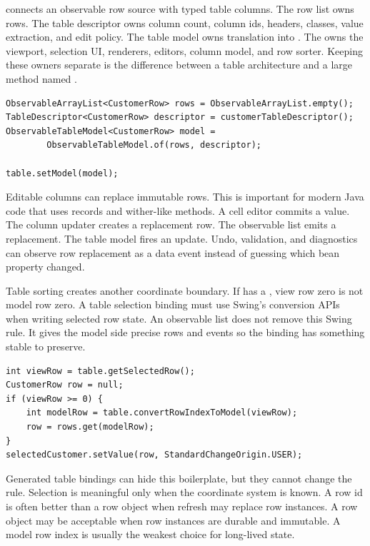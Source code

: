  connects an observable row source with typed table
columns. The row list owns rows. The table descriptor owns column count, column
ids, headers, classes, value extraction, and edit policy. The table model owns
translation into . The  owns the viewport,
selection UI, renderers, editors, column model, and row sorter. Keeping these
owners separate is the difference between a table architecture and a large
method named .

\begin{lstlisting}[caption={ObservableTableModel is the adapter, not the row owner.}]
ObservableArrayList<CustomerRow> rows = ObservableArrayList.empty();
TableDescriptor<CustomerRow> descriptor = customerTableDescriptor();
ObservableTableModel<CustomerRow> model =
        ObservableTableModel.of(rows, descriptor);

table.setModel(model);
\end{lstlisting}

Editable columns can replace immutable rows. This is important for modern Java
code that uses records and wither-like methods. A cell editor commits a value.
The column updater creates a replacement row. The observable list emits a
replacement. The table model fires an update. Undo, validation, and diagnostics
can observe row replacement as a data event instead of guessing which bean
property changed.

Table sorting creates another coordinate boundary. If  has a
, view row zero is not model row zero. A table selection binding
must use Swing's conversion APIs when writing selected row state. An observable
list does not remove this Swing rule. It gives the model side precise rows and
events so the binding has something stable to preserve.

\begin{lstlisting}[caption={View rows must become model rows before reading the list.}]
int viewRow = table.getSelectedRow();
CustomerRow row = null;
if (viewRow >= 0) {
    int modelRow = table.convertRowIndexToModel(viewRow);
    row = rows.get(modelRow);
}
selectedCustomer.setValue(row, StandardChangeOrigin.USER);
\end{lstlisting}

Generated table bindings can hide this boilerplate, but they cannot change the
rule. Selection is meaningful only when the coordinate system is known. A row id
is often better than a row object when refresh may replace row instances. A row
object may be acceptable when row instances are durable and immutable. A model
row index is usually the weakest choice for long-lived state.

